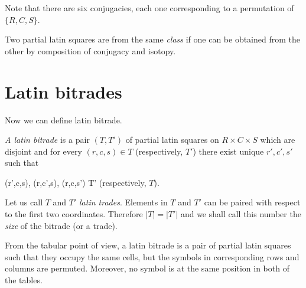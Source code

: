 Note that there are six conjugacies, each one corresponding to a permutation of $\{R,C,S\}$.

\begin{defn}
Two partial latin squares are from the same \emph{class} if one can be obtained from the other by composition of conjugacy and isotopy.
\end{defn}


\section{Latin bitrades}

Now we can define latin bitrade.

\begin{defn}
\emph{A latin bitrade} is a pair $(T, T')$ of partial latin squares on $R \times C \times S$ which are disjoint and for every $(r,c,s) \in T$ (respectively, $T'$) there exist unique $r', c', s'$ such that
\begin{cosyeqnarray}
	(r',c,s), (r,c',s), (r,c,s') \in T' \textrm{ (respectively, $T$)}.
\end{cosyeqnarray}%
Let us call $T$ and $T'$ \emph{latin trades}. Elements in $T$ and $T'$ can be paired with respect to the first two coordinates. Therefore $|T| = |T'|$ and we shall call this number the \emph{size} of the bitrade (or a trade).
\end{defn}

From the tabular point of view, a latin bitrade is a pair of partial latin squares such that they occupy the same cells, but the symbols in corresponding rows and columns are permuted. Moreover, no symbol is at the same position in both of the tables.


